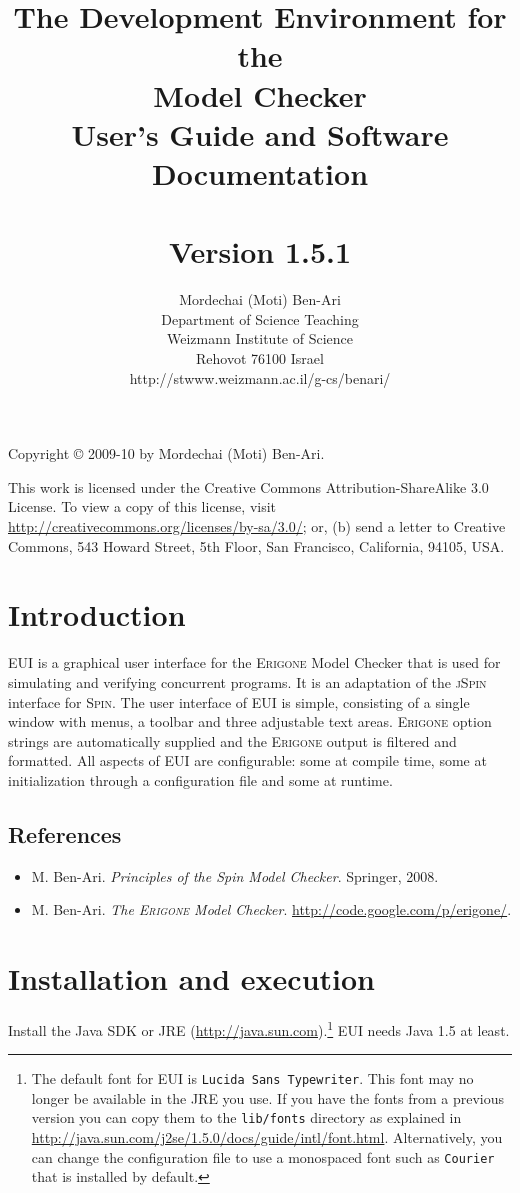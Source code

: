 \documentclass[11pt]{article}
\title{The \eui{} Development Environment for the\\
\eri{} Model Checker\\User's Guide and Software Documentation\\
\mbox{}\\\large{Version 1.5.1}}
\author{Mordechai (Moti) Ben-Ari\\
Department of Science Teaching\\
Weizmann Institute of Science\\
Rehovot 76100 Israel\\
\textsf{http://stwww.weizmann.ac.il/g-cs/benari/}}
\newcommand{\eri}{\textsc{Erigone}}
\newcommand{\eui}{\textsc{EUI}}
\newcommand{\p}[1]{\texttt{#1}}
\begin{document}
\maketitle
\thispagestyle{empty}

\vfill

\begin{center}
Copyright \copyright{} 2009-10 by Mordechai (Moti) Ben-Ari.
\end{center}

This work is licensed under the Creative Commons Attribution-ShareAlike 3.0
License. To view a copy of this license, visit
\url{http://creativecommons.org/licenses/by-sa/3.0/}; or, (b) send a letter
to Creative Commons, 543 Howard Street, 5th Floor, San Francisco,
California, 94105, USA.

\newpage

\section{Introduction}

\eui{} is a graphical user interface for the \eri{} Model Checker that
is used for simulating and verifying concurrent programs. It is an
adaptation of the \textsc{jSpin} interface for \textsc{Spin}. The user
interface of \eui{} is simple, consisting of a single window with menus,
a toolbar and three adjustable text areas. \eri{} option strings are
automatically supplied and the \eri{} output is filtered and formatted.
All aspects of \eui{} are configurable: some at compile time, some at
initialization through a configuration file and some at runtime.

\subsection*{References}
\begin{itemize}
\item M. Ben-Ari. \textit{Principles of the Spin Model Checker}. Springer, 2008.
\item M. Ben-Ari. \textit{The \eri{} Model Checker}. \url{http://code.google.com/p/erigone/}.
\end{itemize}

\section{Installation and execution}
Install the Java SDK or JRE (\url{http://java.sun.com}).\footnote{The
default font for \eui{} is \p{Lucida Sans Typewriter}. This font may no longer be
available in the JRE you use. If you have the fonts from a previous version you
can copy them to the \p{lib/fonts} directory as explained in
\url{http://java.sun.com/j2se/1.5.0/docs/guide/intl/font.html}. Alternatively,
you can change the configuration file to use a monospaced font such as
\p{Courier} that is installed by default.} \eui{} needs Java 1.5 at least.
\end{document}
